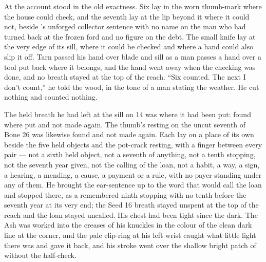 \scenebreak

At  the account stood in the old exactness. Six lay in the worn thumb-mark where the house could check, and the seventh lay at the lip beyond it where it could not, beside 's unforged collector sentence with no name on the man who had turned back at the frozen ford and no figure on the debt. The small knife lay at the very edge of its sill, where it could be checked and where a hand could also slip it off. Tarn passed his hand over blade and sill as a man passes a hand over a tool put back where it belongs, and the hand went away when the checking was done, and no breath stayed at the top of the reach. “Six counted. The next I don't count,” he told the wood, in the tone of a man stating the weather. He cut nothing and counted nothing.

The held breath he had left at the sill on  14 was where it had been put: found where put and not made again. The thumb's resting on the uncut seventh of Bone 26 was likewise found and not made again. Each lay on a place of its own beside the five held objects and the pot-crack resting, with a finger between every pair --- not a sixth held object, not a seventh of anything, not a tenth stopping, not the seventh year given, not the calling of the loan, not a habit, a way, a sign, a hearing, a mending, a cause, a payment or a rule, with no payer standing under any of them. He brought the ear-sentence up to the word that would call the loan and stopped there, as a remembered ninth stopping with no tenth before the seventh year at its very end; the Seed 16 breath stayed unspent at the top of the reach and the loan stayed uncalled. His chest had been tight since the dark. The Ash was worked into the creases of his knuckles in the colour of the clean dark line at the corner, and the pale clip-ring at his left wrist caught what little light there was and gave it back, and his stroke went over the shallow bright patch of  without the half-check.

\scenebreak

